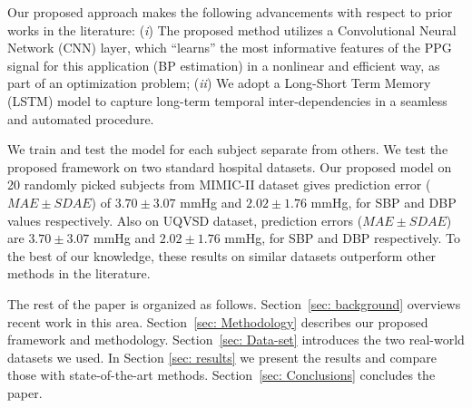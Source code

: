 \documentclass[letterpaper, 10 pt, conference]{ieeeconf}
\begin{document}
Our proposed approach makes the following advancements with respect to prior works in the literature:
(\emph{i}) The proposed method utilizes a Convolutional Neural Network (CNN) layer, which ``learns'' the most informative features of the PPG signal for this application (BP estimation) in a nonlinear and efficient way, as part of an optimization problem; (\emph{ii}) We adopt a Long-Short Term Memory (LSTM) model to capture long-term temporal inter-dependencies in a seamless and automated procedure.

We train and test the model for each subject separate from others. We test the proposed framework on two standard hospital datasets. Our proposed model on 20 randomly picked subjects from MIMIC-II dataset \cite{doi:10.1161/01.CIR.101.23.e215} gives prediction error ($MAE \pm SDAE$) of $3.70\pm3.07$ mmHg and $2.02\pm1.76$ mmHg, for SBP and DBP values respectively. 
Also on UQVSD dataset, prediction errors ($MAE \pm SDAE$) are $3.70\pm3.07$ mmHg and $2.02\pm1.76$ mmHg, for SBP and DBP respectively.
To the best of our knowledge, these results on similar datasets outperform other methods in the literature.

The rest of the paper is organized as follows. Section~\ref{sec: background} overviews recent work in this area. Section~\ref{sec: Methodology} describes our proposed framework and methodology. %
Section~\ref{sec: Data-set} introduces the two real-world datasets we used. In Section \ref{sec: results} we present the results and compare those with state-of-the-art methods. Section~\ref{sec: Conclusions} concludes the paper. 
\end{document}
